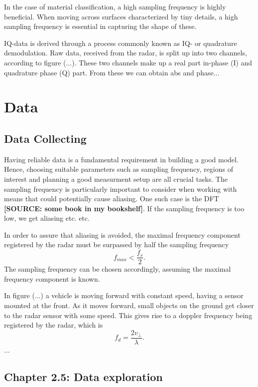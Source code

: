 \documentclass[a4paper, 12pt]{article}
\begin{document}
In the case of material classification, a high sampling frequency is highly beneficial. When moving across surfaces characterized by tiny details, a high sampling frequency is essential in capturing the shape of these.

IQ-data is derived through a process commonly known as IQ- or quadrature demodulation. Raw data, received from the radar, is split up into two channels, according to figure (...). These two channels make up a real part in-phase (I) and quadrature phase (Q) part. From these we can obtain abs and phase...

\section{Data}
\subsection{Data Collecting}
Having reliable data is a fundamental requirement in building a good model. Hence, choosing suitable parameters such as sampling frequency, regions of interest and planning a good measurment setup are all crucial tasks. The sampling frequency is particularly important to consider when working with means that could potentially cause aliasing. One such case is the DFT \textbf{[SOURCE: some book in my bookshelf]}. If the sampling frequency is too low, we get aliasing etc. etc. 

In order to assure that aliasing is avoided, the maximal frequency component registered by the radar must be surpassed by half the sampling frequency
\begin{equation}
	f_{max} < \frac{f_s}{2}.
\end{equation}
The sampling frequency can be chosen accordingly, assuming the maximal frequency component is known. 

In figure (...) a vehicle is moving forward with constant speed, having a sensor mounted at the front. As it moves forward, small objects on the ground get closer to the radar sensor with some speed. This gives rise to a doppler frequency being registered by the radar, which is \citep{lien_gillian_karagozler_amihood_schwesig_olson_raja_poupyrev_2016}
\begin{equation}
	f_{d} = \frac{2v_\perp}{\lambda}.
\end{equation}
...


\subsection{Chapter 2.5: Data exploration}
\end{document}
